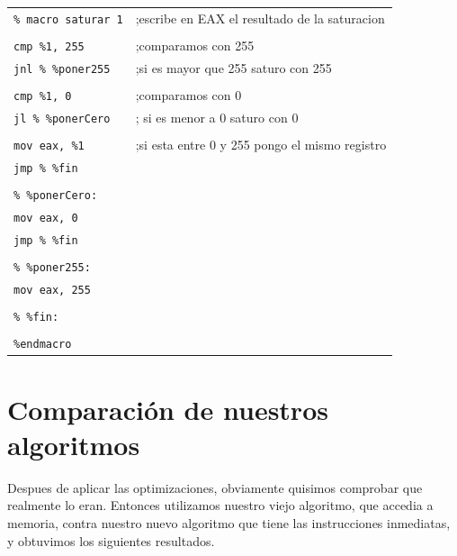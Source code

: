 \documentclass[a4paper, 10pt]{article}
\begin{document}
\begin{tabular}{p{6cm}l}
\texttt{\% macro saturar 1} & ;escribe en EAX el resultado de la saturacion \\
& \\

\hspace*{8mm}\texttt{cmp \%1, 255} & ;comparamos con 255 \\
\hspace*{8mm}\texttt{jnl \% \%poner255} & ;si es mayor que 255 saturo con 255 \\
& \\

\hspace*{8mm}\texttt{cmp \%1, 0} & ;comparamos con 0 \\
\hspace*{8mm}\texttt{jl \% \%ponerCero} & ; si es menor a 0 saturo con 0 \\
& \\
	
\hspace*{8mm}\texttt{mov eax, \%1} & ;si esta entre 0 y 255 pongo el mismo registro \\
\hspace*{8mm}\texttt{jmp \% \%fin}  &  \\
& \\
	
\texttt{\% \%ponerCero:} & \\
\hspace*{8mm}\texttt{mov eax, 0} &  \\
\hspace*{8mm}\texttt{jmp \% \%fin} &  \\
& \\

\texttt{\% \%poner255:} &  \\
\hspace*{8mm}\texttt{mov eax, 255} &  \\
& \\

\texttt{\% \%fin:} &  \\
& \\

\texttt{\%endmacro} &  \\	
\end{tabular}

\newpage

\section{Comparaci\'on de nuestros algoritmos}
Despues de aplicar las optimizaciones, obviamente quisimos comprobar que realmente lo eran.
Entonces utilizamos nuestro viejo algoritmo, que accedia a memoria, contra nuestro nuevo algoritmo que tiene las instrucciones inmediatas, y obtuvimos los siguientes resultados.
\end{document}
